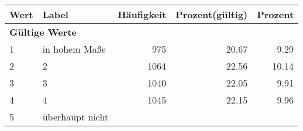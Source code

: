      \begin{longtable}{lXrrr}
     \toprule
     \textbf{Wert} & \textbf{Label} & \textbf{Häufigkeit} & \textbf{Prozent(gültig)} & \textbf{Prozent} \\
     \endhead
     \midrule
     \multicolumn{5}{l}{\textbf{Gültige Werte}}\\

     1 &
     \multicolumn{1}{X}{ in hohem Maße   } &


       \num{975} &
       \num[round-mode=places,round-precision=2]{20.67} &
         \num[round-mode=places,round-precision=2]{9.29} \\

     2 &
     \multicolumn{1}{X}{ 2   } &


       \num{1064} &
       \num[round-mode=places,round-precision=2]{22.56} &
         \num[round-mode=places,round-precision=2]{10.14} \\

     3 &
     \multicolumn{1}{X}{ 3   } &


       \num{1040} &
       \num[round-mode=places,round-precision=2]{22.05} &
         \num[round-mode=places,round-precision=2]{9.91} \\

     4 &
     \multicolumn{1}{X}{ 4   } &


       \num{1045} &
       \num[round-mode=places,round-precision=2]{22.15} &
         \num[round-mode=places,round-precision=2]{9.96} \\

     5 &
     \multicolumn{1}{X}{ überhaupt nicht   } &



\end{longtable}
